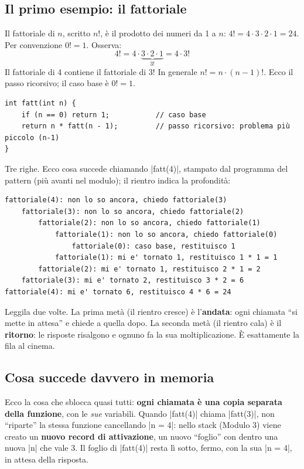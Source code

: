 \subsection*{Il primo esempio: il fattoriale}

Il fattoriale di $n$, scritto $n!$, è il prodotto dei numeri da 1 a $n$:
$4! = 4 \cdot 3 \cdot 2 \cdot 1 = 24$. Per convenzione $0! = 1$. Osserva:
\[
4! = 4 \cdot \underbrace{3 \cdot 2 \cdot 1}_{3!} = 4 \cdot 3!
\]
Il fattoriale di 4 contiene il fattoriale di 3! In generale
$n! = n \cdot (n-1)!$. Ecco il passo ricorsivo; il caso base è $0! = 1$.
\begin{lstlisting}
int fatt(int n) {
    if (n == 0) return 1;           // caso base
    return n * fatt(n - 1);         // passo ricorsivo: problema più piccolo (n-1)
}
\end{lstlisting}
Tre righe. Ecco cosa succede chiamando \cc|fatt(4)|, stampato dal programma del
pattern (più avanti nel modulo); il rientro indica la profondità:

\begin{lstlisting}[language={},numbers=none,backgroundcolor=\color{black!6!sfondo}]
fattoriale(4): non lo so ancora, chiedo fattoriale(3)
    fattoriale(3): non lo so ancora, chiedo fattoriale(2)
        fattoriale(2): non lo so ancora, chiedo fattoriale(1)
            fattoriale(1): non lo so ancora, chiedo fattoriale(0)
                fattoriale(0): caso base, restituisco 1
            fattoriale(1): mi e' tornato 1, restituisco 1 * 1 = 1
        fattoriale(2): mi e' tornato 1, restituisco 2 * 1 = 2
    fattoriale(3): mi e' tornato 2, restituisco 3 * 2 = 6
fattoriale(4): mi e' tornato 6, restituisco 4 * 6 = 24
\end{lstlisting}
Leggila due volte. La prima metà (il rientro cresce) è l'\textbf{andata}: ogni
chiamata ``si mette in attesa'' e chiede a quella dopo. La seconda metà (il rientro
cala) è il \textbf{ritorno}: le risposte risalgono e ognuno fa la sua
moltiplicazione. È esattamente la fila al cinema.

\subsection*{Cosa succede davvero in memoria}

Ecco la cosa che sblocca quasi tutti: \textbf{ogni chiamata è una copia separata
della funzione}, con le \emph{sue} variabili. Quando \cc|fatt(4)| chiama
\cc|fatt(3)|, non ``riparte'' la stessa funzione cancellando \cc|n = 4|: nello
stack (Modulo 3) viene creato un \textbf{nuovo record di attivazione}, un nuovo
``foglio'' con dentro una nuova \cc|n| che vale 3. Il foglio di \cc|fatt(4)| resta
lì sotto, fermo, con la sua \cc|n = 4|, in attesa della risposta.

